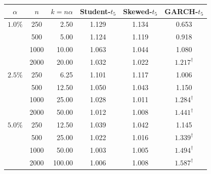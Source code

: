 \begin{tabular}{cc r ccc}
\toprule
$\alpha$ & $n$ & $k = n\alpha$ & Student-$t_5$ & Skewed-$t_5$ & GARCH-$t_5$ \\
\midrule
$1.0\%$ & 250 & 2.50 & 1.129 & 1.134 & 0.653 \\
 & 500 & 5.00 & 1.124 & 1.119 & 0.918 \\
 & 1000 & 10.00 & 1.063 & 1.044 & 1.080 \\
 & 2000 & 20.00 & 1.032 & 1.022 & $1.217^\dagger$ \\
\addlinespace
$2.5\%$ & 250 & 6.25 & 1.101 & 1.117 & 1.006 \\
 & 500 & 12.50 & 1.050 & 1.043 & 1.150 \\
 & 1000 & 25.00 & 1.028 & 1.011 & $1.284^\dagger$ \\
 & 2000 & 50.00 & 1.012 & 1.008 & $1.441^\dagger$ \\
\addlinespace
$5.0\%$ & 250 & 12.50 & 1.039 & 1.042 & 1.145 \\
 & 500 & 25.00 & 1.022 & 1.016 & $1.339^\dagger$ \\
 & 1000 & 50.00 & 1.003 & 1.005 & $1.494^\dagger$ \\
 & 2000 & 100.00 & 1.006 & 1.008 & $1.587^\dagger$ \\
\bottomrule
\end{tabular}
